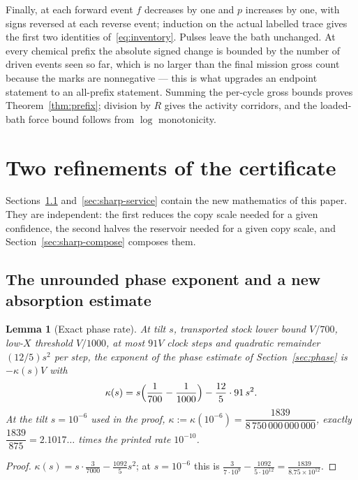 \documentclass[11pt,a4paper]{article}
\theoremstyle{plain}
\newtheorem{lemma}[theorem]{Lemma}
\theoremstyle{definition}
\theoremstyle{remark}
\begin{document}
Finally, at each forward event $f$ decreases by one and $p$ increases by one, with signs reversed at each reverse event; induction on the actual labelled trace gives the first two identities of~\eqref{eq:inventory}. Pulses leave the bath unchanged. At every chemical prefix the absolute signed change is bounded by the number of driven events seen so far, which is no larger than the final mission gross count because the marks are nonnegative --- this is what upgrades an endpoint statement to an all-prefix statement. Summing the per-cycle gross bounds proves Theorem~\ref{thm:prefix}; division by $R$ gives the activity corridors, and the loaded-bath force bound follows from $\log$ monotonicity.

\section{Two refinements of the certificate}\label{sec:sharp}

Sections~\ref{sec:sharp-phase} and~\ref{sec:sharp-service} contain the new mathematics of this paper. They are independent: the first reduces the copy scale needed for a given confidence, the second halves the reservoir needed for a given copy scale, and Section~\ref{sec:sharp-compose} composes them.

\subsection{The unrounded phase exponent and a new absorption estimate}\label{sec:sharp-phase}

\begin{lemma}[Exact phase rate]\label{lem:kappa}
At tilt $s$, transported stock lower bound $V/700$, low-$X$ threshold $V/1000$, at most $91V$ clock steps and quadratic remainder $(12/5)s^2$ per step, the exponent of the phase estimate of Section~\ref{sec:phase} is $-\kappa(s)V$ with
\[
\kappa(s)=s\Bigl(\frac1{700}-\frac1{1000}\Bigr)-\frac{12}5\cdot91\,s^2 .
\]
At the tilt $s=10^{-6}$ used in the proof, $\kappa:=\kappa(10^{-6})=\dfrac{1839}{8\,750\,000\,000\,000}$, exactly $\dfrac{1839}{875}=2.1017\ldots$ times the printed rate $10^{-10}$.
\end{lemma}
\begin{proof}
$\kappa(s)=s\cdot\tfrac3{7000}-\tfrac{1092}5s^2$; at $s=10^{-6}$ this is $\tfrac3{7\cdot10^9}-\tfrac{1092}{5\cdot10^{12}}=\tfrac{1839}{8.75\times10^{12}}$.
\end{proof}
\end{document}
